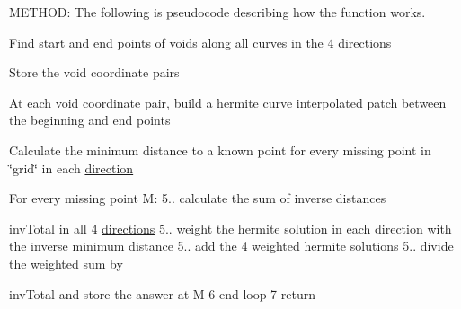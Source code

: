 M\+E\+T\+H\+OD\+: The following is pseudocode describing how the function works.
\begin{DoxyEnumerate}
\item Find start and end points of voids along all curves in the 4 \hyperlink{namespacecvp__ce_DIRECTIONS}{directions}
\item Store the void coordinate pairs
\item At each void coordinate pair, build a hermite curve interpolated patch between the beginning and end points
\item Calculate the minimum distance to a known point for every missing point in \char`\"{}grid\char`\"{} in each \hyperlink{namespacecvp__ce_DIRECTIONS}{direction}
\item For every missing point M\+: 5.. calculate the sum of inverse distances \begin{DoxyItemize}
\item {\ttfamily inv\+Total} in all 4 \hyperlink{namespacecvp__ce_DIRECTIONS}{directions} 5.. weight the hermite solution in each direction with the inverse minimum distance 5.. add the 4 weighted hermite solutions 5.. divide the weighted sum by \item {\ttfamily inv\+Total} and store the answer at M 6 end loop 7 return \end{DoxyItemize}

\end{DoxyEnumerate}